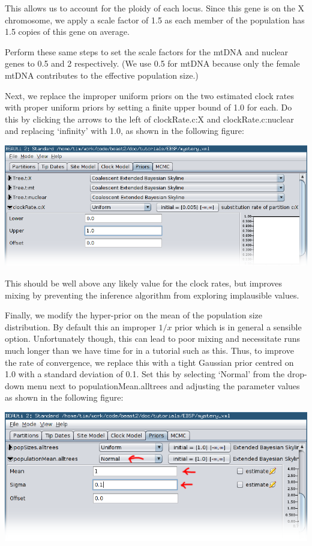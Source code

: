 \documentclass[a4paper,11pt]{article}
\begin{document}
This allows us to account for the ploidy of each locus. Since this gene is on
the X chromosome, we apply a scale factor of 1.5 as each member of the
population has 1.5 copies of this gene on average.

Perform these same steps to set the scale factors for the mtDNA and nuclear
genes to 0.5 and 2 respectively. (We use 0.5 for mtDNA because only the female
mtDNA contributes to the effective population size.)

Next, we replace the improper uniform priors on the two estimated clock rates
with proper uniform priors by setting a finite upper bound of 1.0 for each.  Do
this by clicking the arrows to the left of clockRate.c:X and
clockRate.c:nuclear and replacing `infinity' with 1.0, as shown in
the following figure:

\includegraphics[width=\textwidth]{figures/clockrate_prior.png}

This should be well above any likely value for the
clock rates, but improves mixing by preventing the inference algorithm from
exploring implausible values.

Finally, we modify the hyper-prior on the mean of the population size
distribution. By default this an improper $1/x$ prior which is in general a
sensible option. Unfortunately though, this can lead to poor mixing and
necessitate runs much longer than we have time for in a tutorial such as this.
Thus, to improve the rate of convergence, we replace this with a tight Gaussian
prior centred on 1.0 with a standard deviation of 0.1. Set this by selecting
`Normal' from the drop-down menu next to populationMean.alltrees and adjusting
the parameter values as shown in the following figure:

\includegraphics[width=\textwidth]{figures/popmean.png}
\end{document}
